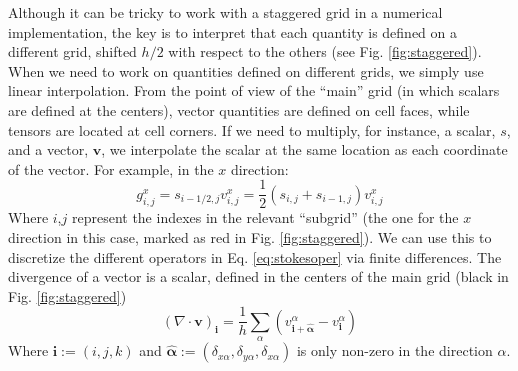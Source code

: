 \documentclass[twoside,openright,titlepage,numbers=noenddot,%
headinclude,footinclude,cleardoublepage=empty,abstract=on,
BCOR=5mm,fontsize=11pt, dvipsnames, paper=b5
]{scrreprt}
\renewcommand{\vec}[1]{\bm{#1}}
\newcommand{\half}{\frac{1}{2}}
\begin{document}
Although it can be tricky to work with a staggered grid in a numerical implementation, the key is to interpret that each quantity is defined on a different grid, shifted $h/2$ with respect to the others (see Fig. \ref{fig:staggered}). When we need to work on quantities defined on different grids, we simply use linear interpolation.
From the point of view of the ``main'' grid (in which scalars are defined at the centers), vector quantities are defined on cell faces, while tensors are located at cell corners. If we need to multiply, for instance, a scalar, $s$, and a vector, $\vec{v}$, we interpolate the scalar at the same location as each coordinate of the vector. For example, in the $x$ direction:
\begin{equation}
  g^x_{i,j} = s_{i-1/2,j} v^x_{i,j} = \half( s_{i,j} + s_{i-1,j})v^x_{i,j}
\end{equation}
Where $i$,$j$ represent the indexes in the relevant ``subgrid'' (the one for the $x$ direction in this case, marked as red in Fig. \ref{fig:staggered}).
We can use this to discretize the different operators in Eq. \eqref{eq:stokesoper} via finite differences.
The divergence of a vector is a scalar, defined in the centers of the main grid (black in Fig. \ref{fig:staggered})
\begin{equation}
  \label{eq:staggereddiv}
  (\nabla\cdot\vec{v})_{\vec{i}} = \frac{1}{h}\sum_\alpha(v^\alpha_{\vec{i} + \vec{\hat{\alpha}}} - v^\alpha_{\vec{i}})
\end{equation}
Where $\vec{i}:=(i,j,k)$ and $\vec{\hat{\alpha}}:=(\delta_{x\alpha}, \delta_{y\alpha}, \delta_{x\alpha})$ is only non-zero in the direction $\alpha$.
\end{document}

